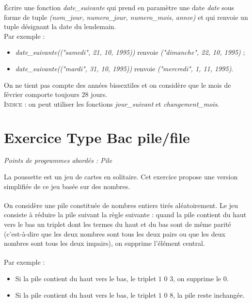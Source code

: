 \documentclass[a4paper, noanswers, addpoints, 12pt]{exam}
\begin{document}
\begin{questions}
\newpage

\question[1] Écrire une fonction \textit{date\_suivante} qui prend en paramètre une date \textit{date} sous forme de tuple \textit{(nom\_jour, numero\_jour, numero\_mois, annee)} et qui renvoie un tuple désignant la date du lendemain.\\
Par exemple :
\begin{itemize}
    \item \textit{date\_suivante(("samedi", 21, 10, 1995))} renvoie \textit{("dimanche", 22, 10, 1995)} ;
    \item \textit{date\_suivante(("mardi", 31, 10, 1995))} renvoie \textit{("mercredi", 1, 11, 1995)}.
\end{itemize}
On ne tient pas compte des années bissextiles et on considère que le mois de février comporte toujours $28$ jours.\\

\textsc{Indice :} on peut utiliser les fonctions \textit{jour\_suivant} et \textit{changement\_mois}.

\vspace{0.5cm}

\section{Exercice Type Bac pile/file}

\begin{center}
    \textit{Points de programmes abordés : Pile}\\
\end{center}

La poussette est un jeu de cartes en solitaire. Cet exercice propose une version simplifiée de ce jeu basée sur des nombres.\\\\
On considère une pile constituée de nombres entiers tirés aléatoirement. Le jeu consiste à réduire la pile suivant la règle suivante : quand la pile contient du haut vers le bas un triplet dont les termes du haut et du bas sont de même parité (c'est-à-dire que les deux nombres sont tous les deux pairs ou que les deux nombres sont tous les deux impairs), on supprime l'élément central.\\\\
Par exemple :
\begin{itemize}
\item Si la pile contient du haut vers le bas, le triplet $1$ $0$ $3$, on supprime le $0$.
\item Si la pile contient du haut vers le bas, le triplet $1$ $0$ $8$, la pile reste inchangée.\\
\end{itemize}


\end{questions}
\end{document}
